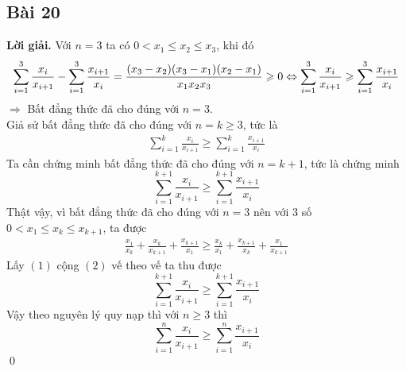 \documentclass[a4paper,14pt]{article}
\begin{document}
    \subsection{Bài 20}
        \textbf{Lời giải.}
            Với $n=3$ ta có $0<x_1\leqslant x_2\leqslant x_3$, khi đó
                \[
                    \sum_{i=1}^3\frac{x_i}{x_{i+1}}-\sum_{i=1}^3\frac{x_{i+1}}{x_i}=\frac{(x_3-x_2)(x_3-x_1)(x_2-x_1)}{x_1x_2x_3}\geqslant 0 \\
                    \Leftrightarrow \sum_{i=1}^3\frac{x_i}{x_{i+1}}\geqslant \sum_{i=1}^3\frac{x_{i+1}}{x_i}
                \]
            $\Rightarrow$ Bất đẳng thức đã cho đúng với $n=3$. \\
            Giả sử bất đẳng thức đã cho đúng với $n=k\geqslant 3$, tức là
                \begin{align}
                    \sum_{i=1}^k\frac{x_i}{x_{i+1}}\geqslant \sum_{i=1}^k\frac{x_{i+1}}{x_i} \tag{1}
                \end{align}
            Ta cần chứng minh bất đẳng thức đã cho đúng với $n=k+1$, tức là chứng minh
                \[
                    \sum_{i=1}^{k+1}\frac{x_i}{x_{i+1}}\geqslant \sum_{i=1}^{k+1}\frac{x_{i+1}}{x_i}
                \]
            Thật vậy, vì bất đẳng thức đã cho đúng với $n=3$ nên với 3 số $0<x_1\leqslant x_k\leqslant x_{k+1}$, ta được
                \begin{align}
                     \frac{x_1}{x_k}+\frac{x_k}{x_{k+1}}+\frac{x_{k+1}}{x_1}\geqslant \frac{x_k}{x_1}+\frac{x_{k+1}}{x_k}+\frac{x_1}{x_{k+1}} \tag{2}
                \end{align}
            Lấy $(1)$ cộng $(2)$ vế theo vế ta thu được
                \[
                    \sum_{i=1}^{k+1}\frac{x_i}{x_{i+1}}\geqslant \sum_{i=1}^{k+1}\frac{x_{i+1}}{x_i}
                \]
        Vậy theo nguyên lý quy nạp thì với $n\geqslant 3$ thì $$\sum_{i=1}^n\frac{x_i}{x_{i+1}}\geqslant \sum_{i=1}^n\frac{x_{i+1}}{x_i}$$
        \qed
\end{document}
